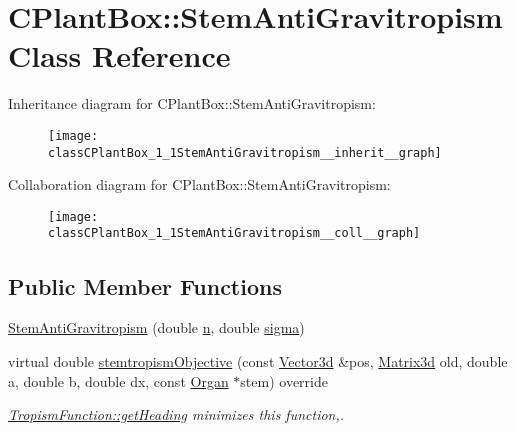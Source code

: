 \hypertarget{classCPlantBox_1_1StemAntiGravitropism}{}\section{C\+Plant\+Box\+:\+:Stem\+Anti\+Gravitropism Class Reference}
\label{classCPlantBox_1_1StemAntiGravitropism}


Inheritance diagram for C\+Plant\+Box\+:\+:Stem\+Anti\+Gravitropism\+:\nopagebreak
\begin{figure}[H]
\begin{center}
\leavevmode
\texttt{[image: classCPlantBox\_1\_1StemAntiGravitropism\_\_inherit\_\_graph]}
\end{center}
\end{figure}


Collaboration diagram for C\+Plant\+Box\+:\+:Stem\+Anti\+Gravitropism\+:\nopagebreak
\begin{figure}[H]
\begin{center}
\leavevmode
\texttt{[image: classCPlantBox\_1\_1StemAntiGravitropism\_\_coll\_\_graph]}
\end{center}
\end{figure}
\subsection*{Public Member Functions}
\begin{DoxyCompactItemize}
\item 
\hyperlink{classCPlantBox_1_1StemAntiGravitropism_a836fb67cd7d99f6220d297340d78c072}{Stem\+Anti\+Gravitropism} (double \hyperlink{classCPlantBox_1_1StemTropismFunction_a54ebffbb66feb026ce61d57f17d4d25a}{n}, double \hyperlink{classCPlantBox_1_1StemTropismFunction_a79ea448c44b07fb59d85e9d130190994}{sigma})
\item 
virtual double \hyperlink{classCPlantBox_1_1StemAntiGravitropism_a7a3c89758c42eb8a5ead1efcdbb08281}{stemtropism\+Objective} (const \hyperlink{classCPlantBox_1_1Vector3d}{Vector3d} \&pos, \hyperlink{classCPlantBox_1_1Matrix3d}{Matrix3d} old, double a, double b, double dx, const \hyperlink{classCPlantBox_1_1Organ}{Organ} $\ast$stem) override
\begin{DoxyCompactList}\small\item\em \hyperlink{classCPlantBox_1_1TropismFunction_adb52b88734a94fe1365a00e02c7e6be5}{Tropism\+Function\+::get\+Heading} minimizes this function,. \end{DoxyCompactList}\end{DoxyCompactItemize}
